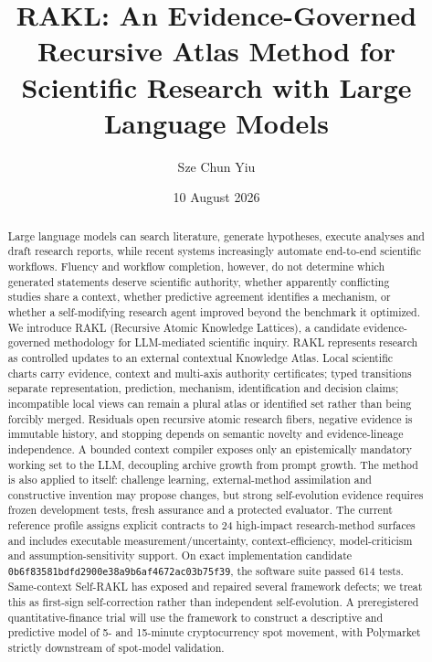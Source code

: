 \documentclass[11pt]{article}
\title{RAKL: An Evidence-Governed Recursive Atlas Method for Scientific Research with Large Language Models}
\author{Sze Chun Yiu}
\date{10 August 2026}
\newcommand{\RAKL}{\textsc{RAKL}}
\newcommand{\SoftwareTests}{614}
\newcommand{\ImplementationSHA}{\texttt{0b6f83581bdfd2900e38a9b6af4672ac03b75f39}}
\begin{document}
\maketitle

\begin{abstract}
Large language models can search literature, generate hypotheses, execute analyses and draft research reports, while recent systems increasingly automate end-to-end scientific workflows. Fluency and workflow completion, however, do not determine which generated statements deserve scientific authority, whether apparently conflicting studies share a context, whether predictive agreement identifies a mechanism, or whether a self-modifying research agent improved beyond the benchmark it optimized. We introduce \RAKL{} (Recursive Atomic Knowledge Lattices), a candidate evidence-governed methodology for LLM-mediated scientific inquiry. \RAKL{} represents research as controlled updates to an external contextual Knowledge Atlas. Local scientific charts carry evidence, context and multi-axis authority certificates; typed transitions separate representation, prediction, mechanism, identification and decision claims; incompatible local views can remain a plural atlas or identified set rather than being forcibly merged. Residuals open recursive atomic research fibers, negative evidence is immutable history, and stopping depends on semantic novelty and evidence-lineage independence. A bounded context compiler exposes only an epistemically mandatory working set to the LLM, decoupling archive growth from prompt growth. The method is also applied to itself: challenge learning, external-method assimilation and constructive invention may propose changes, but strong self-evolution evidence requires frozen development tests, fresh assurance and a protected evaluator. The current reference profile assigns explicit contracts to 24 high-impact research-method surfaces and includes executable measurement/uncertainty, context-efficiency, model-criticism and assumption-sensitivity support. On exact implementation candidate \ImplementationSHA{}, the software suite passed \SoftwareTests{} tests. Same-context Self-\RAKL{} has exposed and repaired several framework defects; we treat this as first-sign self-correction rather than independent self-evolution. A preregistered quantitative-finance trial will use the framework to construct a descriptive and predictive model of 5- and 15-minute cryptocurrency spot movement, with Polymarket strictly downstream of spot-model validation.
\end{abstract}
\end{document}
